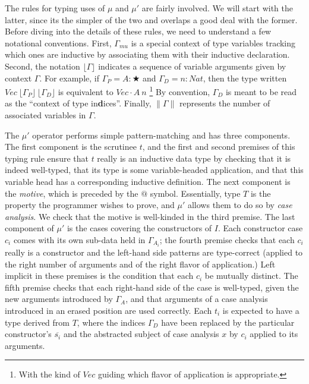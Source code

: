\documentclass{article}
\newcommand{\lowerc}[1]{\lfloor {#1} \rfloor}
\newcommand{\lenc}[1]{\|#1\|}
\newcommand{\vars}[1]{{\overline{#1}}}
\begin{document}
The rules for typing uses of $\mu$ and $\mu'$ are fairly involved. We will start
with the latter, since its the simpler of the two and overlaps a good deal with
the former. Before diving into the details of these rules, we need to understand
a few notational conventions. First, $\Gamma_{mu}$ is a special context of type
variables tracking which ones are inductive by associating them with their
inductive declaration. Second, the notation $\lowerc{\Gamma}$ indicates a
sequence of variable arguments given by context $\Gamma$. For example, if
$\Gamma_P = A : ★$ and $\Gamma_D = n : Nat$, then the type written $Vec\ 
\lowerc{\Gamma_P}\ \lowerc{\Gamma_D}$ is equivalent to $Vec \cdot A\ n$
\footnote{With the kind of $Vec$ guiding which flavor of application is
  appropriate.} By convention, $\Gamma_D$ is meant to be read as the ``context
of type in\textbf{d}ices''. Finally, $\lenc{\Gamma}$ represents the number of
associated variables in $\Gamma$.

The $\mu'$ operator performs simple pattern-matching and has three components.
The first component is the scrutinee $t$, and the first and second premises of
this typing rule ensure that $t$ really is an inductive data type by checking
that it is indeed well-typed, that its type is some variable-headed application,
and that this variable head has a corresponding inductive definition. The next
component is the \textit{motive}, which is preceded by the $@$ symbol.
Essentially, type $T$ is the property the programmer wishes to prove, and $\mu'$
allows them to do so by \textit{case analysis}. We check that the motive is
well-kinded in the third premise. The last component of $\mu'$ is the cases
covering the constructors of $I$. Each constructor case $c_i$ comes with its own
sub-data held in $\Gamma_{A_i}$; the fourth premise checks that each $c_i$
really is a constructor and the left-hand side patterns are type-correct
(applied to the right number of arguments and of the right flavor of
application.) Left implicit in these premises is the condition that each $c_i$
be mutually distinct. The fifth premise checks that each right-hand side of the
case is well-typed, given the new arguments introduced by $\Gamma_A$, and that
arguments of a case analysis introduced in an erased position are used
correctly. Each $t_i$ is expected to have a type derived from $T$, where the
indices $\Gamma_D$ have been replaced by the particular constructor's
$\vars{s_i}$ and the abstracted subject of case analysis $x$ by $c_i$ applied to
its arguments.
\end{document}
